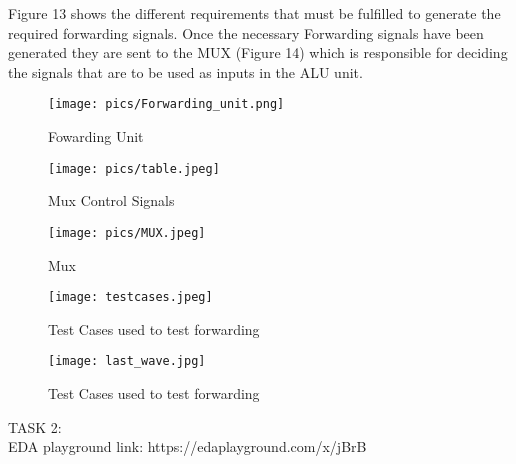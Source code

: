 \documentclass{article}
\begin{document}
Figure 13 shows the different requirements that must be fulfilled to generate the required forwarding signals. Once the necessary Forwarding signals have been generated they are sent to the MUX (Figure 14) which is responsible for deciding the signals that are to be used as inputs in the ALU unit. 

\begin{center}
    \begin{figure}[!htb]
        \centering
        \texttt{[image: pics/Forwarding\_unit.png]}
        \caption{Fowarding Unit}
        \label{Snapshot of Memory}
    \end{figure}
\end{center}

\newpage

\begin{center}
    \begin{figure}[!htb]
        \centering
        \texttt{[image: pics/table.jpeg]}
        \caption{Mux Control Signals}
        \label{Snapshot of Memory}
    \end{figure}
\end{center}

\begin{center}
    \begin{figure}[!htb]
        \centering
        \texttt{[image: pics/MUX.jpeg]}
        \caption{Mux}
        \label{Snapshot of Memory}
    \end{figure}
\end{center}

\begin{center}
    \begin{figure}[!htb]
        \centering
        \texttt{[image: testcases.jpeg]}
        \caption{Test Cases used to test forwarding}
        \label{Snapshot of Memory}
    \end{figure}
\end{center}

\begin{center}
    \begin{figure}[!htb]
        \centering
        \texttt{[image: last\_wave.jpg]}
        \caption{Test Cases used to test forwarding}
        \label{Snapshot of Memory}
    \end{figure}
\end{center}


TASK 2:\\
EDA playground link: https://edaplayground.com/x/jBrB
\end{document}
